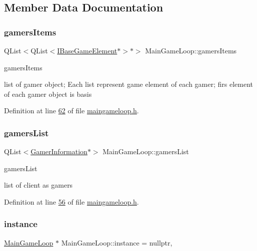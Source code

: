\subsection{Member Data Documentation}
\mbox{\label{a00209_a7e240933ce2cf3b29a05c5061aa5226b}} 
\subsubsection{\texorpdfstring{gamers\+Items}{gamersItems}}
{\footnotesize\ttfamily Q\+List$<$Q\+List$<$\hyperlink{a00137}{I\+Base\+Game\+Element}$\ast$$>$$\ast$$>$ Main\+Game\+Loop\+::gamers\+Items\hspace{0.3cm}{\ttfamily [protected]}}



gamers\+Items 

list of gamer object; Each list represent game element of each gamer; firs element of each gamer object is basis 

Definition at line \hyperlink{a00092_source_l00062}{62} of file \hyperlink{a00092_source}{maingameloop.\+h}.

\mbox{\label{a00209_aac8195bc3183cb0cabe65f1ff813fbfb}} 
\subsubsection{\texorpdfstring{gamers\+List}{gamersList}}
{\footnotesize\ttfamily Q\+List$<$\hyperlink{a00213}{Gamer\+Information}$\ast$$>$ Main\+Game\+Loop\+::gamers\+List\hspace{0.3cm}{\ttfamily [protected]}}



gamers\+List 

list of client as gamers 

Definition at line \hyperlink{a00092_source_l00056}{56} of file \hyperlink{a00092_source}{maingameloop.\+h}.

\mbox{\label{a00209_a2578ca393ef9030407e5b3ac17b9f6ab}} 
\subsubsection{\texorpdfstring{instance}{instance}}
{\footnotesize\ttfamily \hyperlink{a00209}{Main\+Game\+Loop} $\ast$ Main\+Game\+Loop\+::instance = nullptr\hspace{0.3cm}{\ttfamily [static]}, {\ttfamily [private]}}



